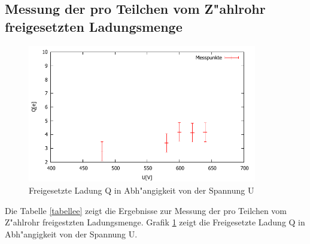 	\subsection{Messung der pro Teilchen vom Z"ahlrohr freigesetzten Ladungsmenge} %
	\label{sub:messung_der_pro_teilchen_vom_z"ahlrohr_freigesetzten_ladungsmenge}
	
	

	\begin{figure}[!h]
		\centering
		\includegraphics[width = 10cm]{img/ladung.pdf}
		\caption{Freigesetzte Ladung Q in Abh"angigkeit von der Spannung U}
		\label{ladung}
	\end{figure}

	Die Tabelle \ref{tabellee} zeigt die Ergebnisse zur Messung der pro Teilchen vom Z"ahlrohr freigestzten Ladungsmenge.
	Grafik \ref{ladung} zeigt die Freigesetzte Ladung Q in Abh"angigkeit von der Spannung U.